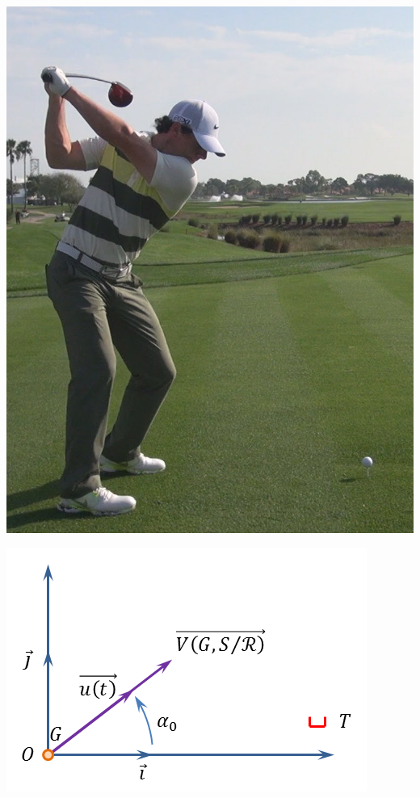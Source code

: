 \documentclass[10pt]{article}
\begin{document}

\begin{minipage}[c]{.2\linewidth}
\begin{center}
\includegraphics[width=.95\textwidth]{images/swing}
\end{center}
\end{minipage}\hfill
\begin{minipage}[c]{.33\linewidth}
\begin{center}
\includegraphics[width=.9\textwidth]{images/situation}
\end{center}
\end{minipage}\hfill
\end{document}
